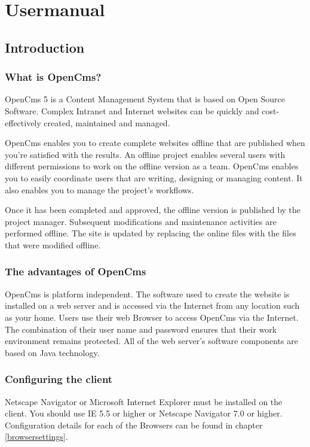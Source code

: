 \chapter{Usermanual}

\section{Introduction}

\subsection{What is OpenCms?}

OpenCms 5 is a Content Management System that is based on Open
Source Software. Complex Intranet and Internet websites can be
quickly and cost-effectively created, maintained and managed.

OpenCms enables you to create complete websites offline that are
published when you're satisfied with the results. An offline
project enables several users with different permissions to work
on the offline version as a team. OpenCms enables you to easily
coordinate users that are writing, designing or managing content.
It also enables you to manage the project's workflows.

Once it has been completed and approved, the offline version is
published by the project manager. Subsequent modifications and
maintenance activities are performed offline. The site is updated
by replacing the online files with the files that were modified
offline.

\subsection{The advantages of OpenCms}

OpenCms is platform independent. The software used to create the
website is installed on a web server and is accessed via the
Internet from any location such as your home. Users use their web
Browser to access OpenCms via the Internet. The combination of
their user name and password ensures that their work environment
remains protected. All of the web server's software components are
based on Java technology.

\subsection{Configuring the client}

Netscape Navigator or Microsoft Internet Explorer must be
installed on the client. You should use IE 5.5 or higher or
Netscape Navigator 7.0 or higher. Configuration details for each of
the Browsers can be found in chapter \ref{browsersettings}. 

